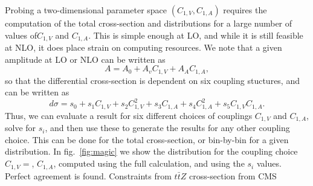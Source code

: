 \documentclass[preprint]{JHEP3} %
\begin{document}
Probing a two-dimensional parameter space $(C_{1,V},C_{1,A})$ requires the computation of the total cross-section and distributions for a large number of values of$C_{1,V}$ and $C_{1,A}$. This is simple enough at LO, and while it is still feasible at NLO, it does place strain on computing resources. We note that a given amplitude at LO or NLO can be written as
\begin{equation}
A = A_0 + A_v C_{1,V} + A_A C_{1,A},
\end{equation}
so that the differential cross-section is dependent on six coupling stuctures, and can be written as
\begin{equation}
d\sigma = s_0 +s_1C_{1,V} + s_2C_{1,V}^2 +s_3 C_{1,A}+s_4C_{1,A}^2+s_5C_{1,V}C_{1,A}.
\end{equation}
Thus, we can evaluate a result for six different choices of couplings $C_{1,V}$ and $C_{1,A}$, solve for $s_i$, and then use these to generate the results for any other coupling choice. This can be done for the total cross-section, or bin-by-bin for a given distribution. In fig.~\ref{fig:magic} we show the distribution for the coupling choice $C_{1,V}=$, $C_{1,A}$, computed using the full calculation, and using the $s_i$ values. Perfect agreement is found. 
Constraints from $t\bar{t}Z$ cross-section from CMS \\
\end{document}
